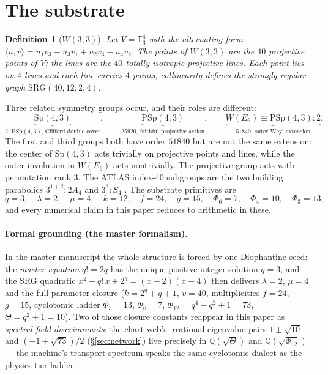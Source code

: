 \documentclass[11pt]{article}
\newtheorem{definition}[theorem]{Definition}
\newcommand{\W}{W(3,3)}
\newcommand{\GF}[1]{\mathbb{F}_{#1}}
\newcommand{\Sp}{\mathrm{Sp}}
\newcommand{\PSp}{\mathrm{PSp}}
\begin{document}
\section{The substrate}
\label{sec:substrate}

\begin{definition}[$\W$]
Let $V=\GF3^4$ with the alternating form
$\langle u,v\rangle = u_1v_3-u_3v_1+u_2v_4-u_4v_2$.  The points of
$\W$ are the $40$ projective points of $V$; the lines are the $40$
totally isotropic projective lines.  Each point lies on $4$ lines and
each line carries $4$ points; collinearity defines the strongly regular
graph $\mathrm{SRG}(40,12,2,4)$.
\end{definition}

Three related symmetry groups occur, and their roles are different:
\[
\underbrace{\Sp(4,3)}_{2\cdot\PSp(4,3)\text{, Clifford double cover}},
\qquad
\underbrace{\PSp(4,3)}_{25920\text{, faithful projective action}},
\qquad
\underbrace{W(E_6)\cong\PSp(4,3){:}2}_{51840\text{, outer Weyl extension}}.
\]
The first and third groups both have order $51840$ but are not the
same extension: the center of $\Sp(4,3)$ acts trivially on projective
points and lines, while the outer involution in $W(E_6)$ acts
nontrivially.  The projective group acts with permutation rank $3$.
The ATLAS index-$40$ subgroups are the two building parabolics
$3^{1+2}{:}2A_4$ and $3^3{:}S_4$ \cite{atlasu42}.  The substrate
primitives are
\[
q=3,\quad \lambda=2,\quad \mu=4,\quad k=12,\quad f=24,\quad g=15,\quad
\Phi_6=7,\quad \Phi_4=10,\quad \Phi_3=13,
\]
and every numerical claim in this paper reduces to arithmetic in these.

\paragraph{Formal grounding (the master formalism).}
In the master manuscript \cite{w33paper} the whole structure is forced
by one Diophantine seed: the \emph{master equation} $q! = 2q$ has the
unique positive-integer solution $q=3$, and the SRG quadratic
$x^2 - q!\,x + 2^q = (x-2)(x-4)$ then delivers $\lambda=2$, $\mu=4$ and
the full parameter closure ($k=2^q+q+1$, $v=40$, multiplicities $f=24$,
$g=15$, cyclotomic ladder $\Phi_3=13$, $\Phi_6=7$, $\Phi_{12}=q^4-q^2+1=73$,
$\Theta=q^2+1=10$).  Two of those closure constants reappear in this
paper as \emph{spectral field discriminants}: the chart-web's irrational
eigenvalue pairs $1\pm\sqrt{10}$ and $(-1\pm\sqrt{73})/2$
(\S\ref{sec:network}) live precisely in $\mathbb{Q}(\sqrt{\Theta})$ and
$\mathbb{Q}(\sqrt{\Phi_{12}})$ --- the machine's transport spectrum
speaks the same cyclotomic dialect as the physics tier ladder.
\end{document}
